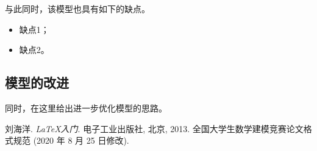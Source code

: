 \documentclass[withoutpreface,bwprint]{cumcmthesis}
\begin{document}
与此同时，该模型也具有如下的缺点。
\begin{itemize}
    \item 缺点1；
    \item 缺点2。
\end{itemize}

\subsection{模型的改进}

同时，在这里给出进一步优化模型的思路。


\begin{thebibliography}{9}%
    刘海洋.
    \newblock \emph{\LaTeX {}入门}\allowbreak[J].
    \newblock 电子工业出版社, 北京, 2013.
    全国大学生数学建模竞赛论文格式规范 (2020 年 8 月 25 日修改).
\end{thebibliography}

\newpage

\end{document}
